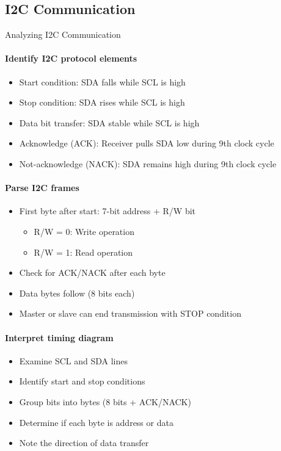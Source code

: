 \subsection{I2C Communication}

\begin{KR}{Analyzing I2C Communication}
\paragraph{Identify I2C protocol elements}
\begin{itemize}
    \item Start condition: SDA falls while SCL is high
    \item Stop condition: SDA rises while SCL is high
    \item Data bit transfer: SDA stable while SCL is high
    \item Acknowledge (ACK): Receiver pulls SDA low during 9th clock cycle
    \item Not-acknowledge (NACK): SDA remains high during 9th clock cycle
\end{itemize}

\paragraph{Parse I2C frames}
\begin{itemize}
    \item First byte after start: 7-bit address + R/W bit
    \begin{itemize}
        \item R/W = 0: Write operation
        \item R/W = 1: Read operation
    \end{itemize}
    \item Check for ACK/NACK after each byte
    \item Data bytes follow (8 bits each)
    \item Master or slave can end transmission with STOP condition
\end{itemize}

\paragraph{Interpret timing diagram}
\begin{itemize}
    \item Examine SCL and SDA lines
    \item Identify start and stop conditions
    \item Group bits into bytes (8 bits + ACK/NACK)
    \item Determine if each byte is address or data
    \item Note the direction of data transfer
\end{itemize}
\end{KR}


